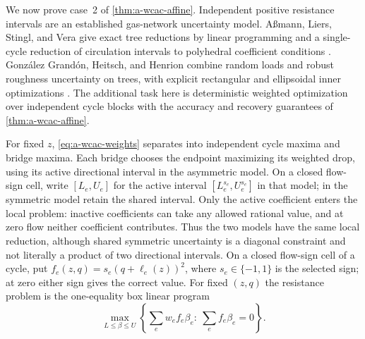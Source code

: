 We now prove case~2 of \cref{thm:a-wcac-affine}. Independent positive
resistance intervals are an established gas-network uncertainty model.
A\ss mann, Liers, Stingl, and Vera give exact tree reductions by linear
programming and a single-cycle reduction of circulation intervals to
polyhedral coefficient conditions
\citep[Sections~4.2 and~4.3.3, Lemma~4.10]{amann2018-deciding-robust-feasibility-and-infeasibility}.
Gonz\'alez Grand\'on, Heitsch, and Henrion combine random loads and robust
roughness uncertainty on trees, with explicit rectangular and ellipsoidal
inner optimizations \citep[Sections~2--3]{gonzalez2017-joint}.
The additional task here is deterministic weighted optimization over
independent cycle blocks with the accuracy and recovery guarantees of
\cref{thm:a-wcac-affine}.

For fixed $z$, \eqref{eq:a-wcac-weights} separates into independent cycle
maxima and bridge maxima. Each bridge chooses the endpoint maximizing its
weighted drop, using its active directional interval in the asymmetric
model. On a closed flow-sign cell, write $[L_e,U_e]$ for the active
interval $[L_e^{s_e},U_e^{s_e}]$ in that model; in the symmetric model
retain the shared interval. Only the active coefficient enters the local
problem: inactive coefficients can take any allowed rational value, and
at zero flow neither coefficient contributes. Thus the two models have
the same local reduction, although shared symmetric uncertainty is a
diagonal constraint and not literally a product of two directional
intervals. On a closed flow-sign cell of a cycle, put
$f_e(z,q)=s_e(q+\ell_e(z))^2$, where $s_e\in\{-1,1\}$ is the selected
sign; at zero either sign gives the correct value. For fixed $(z,q)$ the
resistance problem is the one-equality box linear program
\begin{equation}
 \max_{L\le\beta\le U}
 \left\{\sum_e w_ef_e\beta_e:\ \sum_e f_e\beta_e=0\right\}.
 \label{eq:a-wcac-local-lp}
\end{equation}

